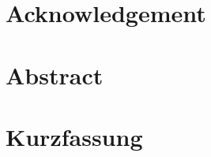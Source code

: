 \documentclass[12pt,twoside]{report}
\begin{document}
\chapter*{Acknowledgement}


\chapter*{Abstract}

\chapter*{Kurzfassung}



\tableofcontents



\clearpage


\end{document}
